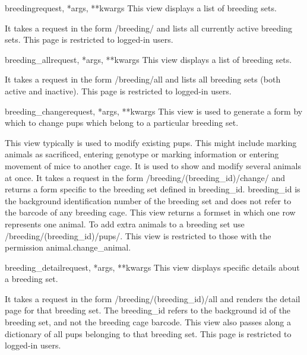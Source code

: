 \documentclass[letterpaper,10pt,english]{sphinxmanual}
\begin{document}
\hypertarget{animal.views.breeding}{}\begin{funcdesc}{breeding}{request, *args, **kwargs}
This view displays a list of breeding sets.

It takes a request in the form /breeding/ and lists all currently active breeding sets.
This page is restricted to logged-in users.
\end{funcdesc}

\hypertarget{animal.views.breeding\_all}{}\begin{funcdesc}{breeding\_all}{request, *args, **kwargs}
This view displays a list of breeding sets.

It takes a request in the form /breeding/all and lists all breeding sets (both active and inactive).
This page is restricted to logged-in users.
\end{funcdesc}

\hypertarget{animal.views.breeding\_change}{}\begin{funcdesc}{breeding\_change}{request, *args, **kwargs}
This view is used to generate a form by which to change pups which belong to a particular breeding set.

This view typically is used to modify existing pups.  This might include marking animals as sacrificed, entering genotype or marking information or entering movement of mice to another cage.  It is used to show and modify several animals at once.
It takes a request in the form /breeding/(breeding\_id)/change/ and returns a form specific to the breeding set defined in breeding\_id.  breeding\_id is the background identification number of the breeding set and does not refer to the barcode of any breeding cage.
This view returns a formset in which one row represents one animal.  To add extra animals to a breeding set use /breeding/(breeding\_id)/pups/.
This view is restricted to those with the permission animal.change\_animal.
\end{funcdesc}

\hypertarget{animal.views.breeding\_detail}{}\begin{funcdesc}{breeding\_detail}{request, *args, **kwargs}
This view displays specific details about a breeding set.

It takes a request in the form /breeding/(breeding\_id)/all and renders the detail page for that breeding set.
The breeding\_id refers to the background id of the breeding set, and not the breeding cage barcode.
This view also passes along a dictionary of all pups belonging to that breeding set.
This page is restricted to logged-in users.
\end{funcdesc}
\end{document}

